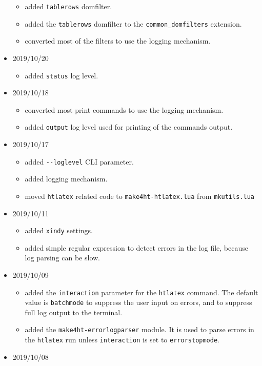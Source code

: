 \begin{itemize}
  \begin{itemize}
  \tightlist
  \item
    added \texttt{tablerows} domfilter.
  \item
    added the \texttt{tablerows} domfilter to the
    \texttt{common\_domfilters} extension.
  \item
    converted most of the filters to use the logging mechanism.
  \end{itemize}
\item
  2019/10/20

  \begin{itemize}
  \tightlist
  \item
    added \texttt{status} log level.
  \end{itemize}
\item
  2019/10/18

  \begin{itemize}
  \tightlist
  \item
    converted most print commands to use the logging mechanism.
  \item
    added \texttt{output} log level used for printing of the commands
    output.
  \end{itemize}
\item
  2019/10/17

  \begin{itemize}
  \tightlist
  \item
    added \texttt{-\/-loglevel} CLI parameter.
  \item
    added logging mechanism.
  \item
    moved \texttt{htlatex} related code to \texttt{make4ht-htlatex.lua}
    from \texttt{mkutils.lua}
  \end{itemize}
\item
  2019/10/11

  \begin{itemize}
  \tightlist
  \item
    added \texttt{xindy} settings.
  \item
    added simple regular expression to detect errors in the log file,
    because log parsing can be slow.
  \end{itemize}
\item
  2019/10/09

  \begin{itemize}
  \tightlist
  \item
    added the \texttt{interaction} parameter for the \texttt{htlatex}
    command. The default value is \texttt{batchmode} to suppress the
    user input on errors, and to suppress full log output to the
    terminal.
  \item
    added the \texttt{make4ht-errorlogparser} module. It is used to
    parse errors in the \texttt{htlatex} run unless \texttt{interaction}
    is set to \texttt{errorstopmode}.
  \end{itemize}
\item
  2019/10/08


\end{itemize}
